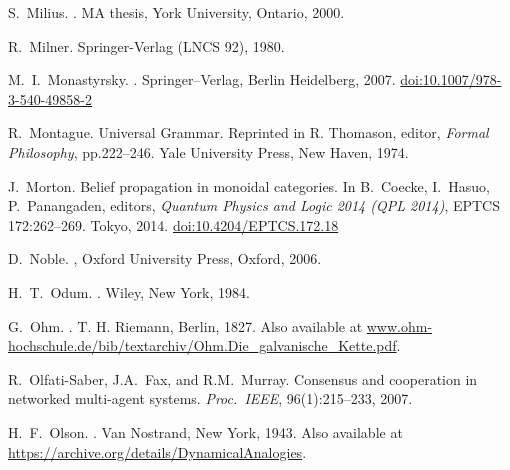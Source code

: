 \begin{thebibliography}{RSW00}
    S.\ Milius.
    . MA thesis, York University,
    Ontario, 2000.

    R.\ Milner.
    \newblock Springer-Verlag (LNCS 92), 1980.

    M.\ I.\ Monastyrsky.
    .
    \newblock Springer--Verlag, Berlin Heidelberg, 2007.
    \newblock \href{http://dx.doi.org/10.1007/978-3-540-49858-2}{doi:10.1007/978-3-540-49858-2}

    R.\ Montague.
    \newblock Universal Grammar.
    \newblock Reprinted in R. Thomason, editor, {\em Formal Philosophy}, pp.222--246. Yale
    University Press, New Haven, 1974. 

    J.\ Morton.
    \newblock Belief propagation in monoidal categories. 
    \newblock In B.\ Coecke, I.\ Hasuo, P.\ Panangaden, editors, {\em Quantum Physics and Logic 2014 (QPL 2014)}, EPTCS 172:262--269. Tokyo, 2014.  
    \newblock
    \href{http://dx.doi.org/10.4204/EPTCS.172.18}{doi:10.4204/EPTCS.172.18 }
    
    D.\ Noble.
    , Oxford
    University Press, Oxford, 2006.


    H.\ T.\ Odum.
    . Wiley, New York, 1984.

    G.\ Ohm.
    .
    T. H. Riemann, Berlin, 1827.
    \newblock Also available at
    \href{http://www.ohm-hochschule.de/bib/textarchiv/Ohm.Die_galvanische_Kette.pdf}{www.ohm-hochschule.de/bib/textarchiv/Ohm.Die\_galvanische\_Kette.pdf}.

    R.\ Olfati-Saber, J.A.\ Fax, and R.M.\ Murray.
    \newblock Consensus and cooperation in networked multi-agent systems.
    \newblock \emph{Proc.\ IEEE}, 96(1):215--233, 2007.

    H.\ F.\ Olson.
    . Van
    Nostrand, New York, 1943.
    \newblock Also available at 
    \href{https://archive.org/details/DynamicalAnalogies}
    {https://archive.org/details/DynamicalAnalogies}.


\end{thebibliography}
